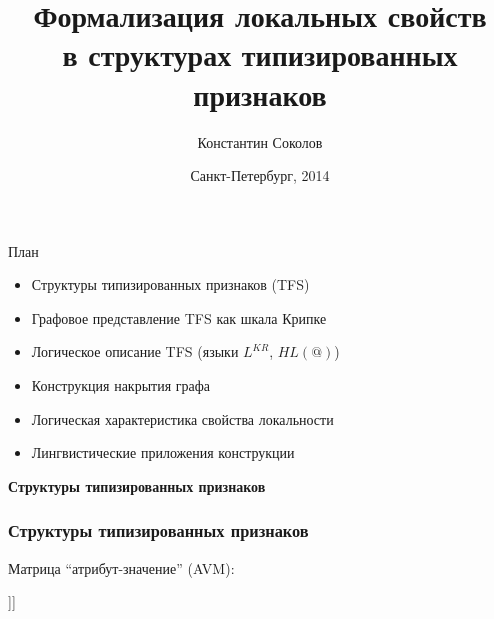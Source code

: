 \documentclass{beamer}
\begin{document}
\title{\Large{Формализация локальных свойств\\в структурах типизированных признаков}}
\author{Константин Соколов}
\date{Санкт-Петербург, 2014} 
\begin{frame}
    \thispagestyle{empty}
    \titlepage
\end{frame}

\begin{frame}{План}
    \setcounter{framenumber}{1}
    \begin{itemize}
        \item Структуры типизированных признаков (TFS)
        \item Графовое представление TFS как шкала Крипке
        \item Логическое описание TFS (языки $L^{KR}$, $HL(@)$)
        \item Конструкция накрытия графа
        \item Логическая характеристика свойства локальности
        \item Лингвистические приложения конструкции  %
    \end{itemize}
\end{frame}

\begin{frame}{}
\begin{center}
	\textbf{Структуры типизированных признаков}
\end{center}
\end{frame}

\begin{frame}[fragile]
\frametitle{Структуры типизированных признаков}
Матрица ``атрибут-значение'' (AVM):\\
\begin{center}
	\begin{avm}
	[{action} predicate & on \cr
    	      Mood & imp \cr 
        	  Actor & @{1} \cr 
	          Patient & [{thing} predicate & @{2} лампа \cr
    	                         Num & sg \cr 
        	                     Modifier & [{q-color} predicate & красный\_adj ]]]
	\end{avm}
\end{center}	
\end{frame}
\end{document}
